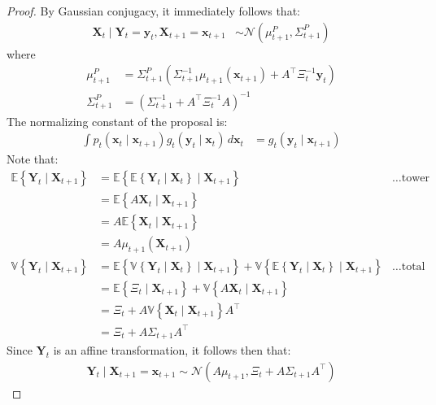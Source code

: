 \begin{proof}
    By Gaussian conjugacy, it immediately follows that:
    \begin{align*}
        \mathbf{X}_{t} \mid \mathbf{Y}_{t} = \mathbf{y}_{t}, \mathbf{X}_{t+1} = \mathbf{x}_{t+1} &\sim \mathcal{N}\left( \mu_{t+1}^P, \Sigma_{t+1}^P \right) 
    \end{align*}
    where
    \begin{align*}
        \mu_{t+1}^P &= \Sigma_{t+1}^P\left( \Sigma_{t+1}^{-1}\mu_{t+1}(\mathbf{x}_{t+1}) + A^\top\Xi_{t}^{-1}\mathbf{y}_{t} \right) \\
        \Sigma_{t+1}^P &= \left( \Sigma_{t+1}^{-1} + A^\top \Xi_{t}^{-1}A \right)^{-1}
    \end{align*}
    The normalizing constant of the proposal is:
    \begin{align*}
        \int p_{t}(\mathbf{x}_{t} \mid \mathbf{x}_{t+1})g_{t}(\mathbf{y}_{t} \mid \mathbf{x}_{t}) \, d\mathbf{x}_{t} &= g_{t}(\mathbf{y}_{t} \mid \mathbf{x}_{t+1})
    \end{align*}
    Note that:
    \begin{align*}
        \mathbb{E}\left\{ \mathbf{Y}_{t} \mid \mathbf{X}_{t+1} \right\} &= \mathbb{E}\left\{\mathbb{E}\left\{\mathbf{Y}_{t} \mid \mathbf{X}_{t}\right\} \mid \mathbf{X}_{t+1}\right\} &\dots\text{tower property} \\
        &= \mathbb{E}\left\{A\mathbf{X}_{t} \mid \mathbf{X}_{t+1}\right\} \\
        &= A\mathbb{E}\left\{\mathbf{X}_{t} \mid \mathbf{X}_{t+1}\right\} \\
        &= A\mu_{t+1}(\mathbf{X}_{t+1}) \\
        \mathbb{V}\left\{\mathbf{Y}_{t} \mid \mathbf{X}_{t+1}\right\} &= \mathbb{E}\left\{\mathbb{V}\left\{\mathbf{Y}_{t} \mid \mathbf{X}_{t}\right\} \mid \mathbf{X}_{t+1}\right\} + \mathbb{V}\left\{\mathbb{E}\left\{\mathbf{Y}_{t} \mid \mathbf{X}_{t}\right\} \mid \mathbf{X}_{t+1}\right\} &\dots \text{total variance} \\
        &= \mathbb{E}\left\{\Xi_{t} \mid \mathbf{X}_{t+1}\right\} + \mathbb{V}\left\{A\mathbf{X}_{t} \mid \mathbf{X}_{t+1}\right\} \\
        &= \Xi_{t} + A\mathbb{V}\left\{\mathbf{X}_{t} \mid \mathbf{X}_{t+1}\right\}A^{\top} \\
        &= \Xi_{t} + A\Sigma_{t+1}A^{\top}
    \end{align*}
    Since $\mathbf{Y}_{t}$ is an affine transformation, it follows then that:
    \begin{align*}
        \mathbf{Y}_{t} \mid \mathbf{X}_{t+1} = \mathbf{x}_{t+1} \sim \mathcal{N}\left( A\mu_{t+1}, \Xi_{t} + A\Sigma_{t+1}A^\top \right) 
    \end{align*}
\end{proof}

